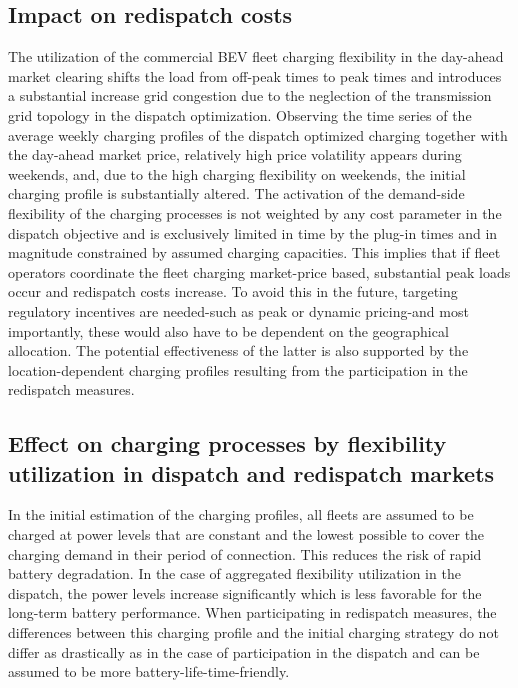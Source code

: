 \documentclass[final,10pt]{elsarticle}
\begin{document}

        \subsection{Impact on redispatch costs}
            The utilization of the commercial \ac{BEV} fleet charging flexibility in the day-ahead market clearing shifts the load from off-peak times to peak times and introduces a substantial increase grid congestion due to the neglection of the transmission grid topology in the dispatch optimization. Observing the time series of the average weekly charging profiles of the dispatch optimized charging together with the day-ahead market price, relatively high price volatility appears during weekends, and, due to the high charging flexibility on weekends, the initial charging profile is substantially altered. The activation of the demand-side flexibility of the charging processes is not weighted by any cost parameter in the dispatch objective and is exclusively limited in time by the plug-in times and in magnitude constrained by assumed charging capacities. This implies that if fleet operators coordinate the fleet charging market-price based, substantial peak loads occur and redispatch costs increase. To avoid this in the future, targeting regulatory incentives are needed-such as peak or dynamic pricing-and most importantly, these would also have to be dependent on the geographical allocation. The potential effectiveness of the latter is also supported by the location-dependent charging profiles resulting from the participation in the redispatch measures. 

        \subsection{Effect on charging processes by flexibility utilization in dispatch and redispatch markets}
            In the initial estimation of the charging profiles, all fleets are assumed to be charged at power levels that are constant and the lowest possible to cover the charging demand in their period of connection. This reduces the risk of rapid battery degradation. In the case of aggregated flexibility utilization in the dispatch, the power levels increase significantly which is less favorable for the long-term battery performance. When participating in redispatch measures, the differences between this charging profile and the initial charging strategy do not differ as drastically as in the case of participation in the dispatch and can be assumed to be more battery-life-time-friendly. 
    
\end{document}
